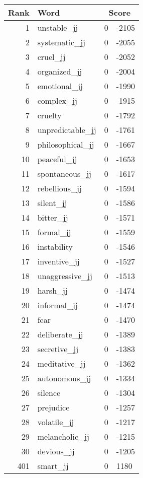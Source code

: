\begin{longtable}[!htbp]{| rlr@{.}l |}
    \hline
    \textbf{Rank} & \textbf{Word} & \multicolumn{2}{c|}{\textbf{Score}} \\
    \hline
    \endhead
    1 & unstable\_jj & 0 & -2105 \\
    2 & systematic\_jj & 0 & -2055 \\
    3 & cruel\_jj & 0 & -2052 \\
    4 & organized\_jj & 0 & -2004 \\
    5 & emotional\_jj & 0 & -1990 \\
    6 & complex\_jj & 0 & -1915 \\
    7 & cruelty & 0 & -1792 \\
    8 & unpredictable\_jj & 0 & -1761 \\
    9 & philosophical\_jj & 0 & -1667 \\
    10 & peaceful\_jj & 0 & -1653 \\
    11 & spontaneous\_jj & 0 & -1617 \\
    12 & rebellious\_jj & 0 & -1594 \\
    13 & silent\_jj & 0 & -1586 \\
    14 & bitter\_jj & 0 & -1571 \\
    15 & formal\_jj & 0 & -1559 \\
    16 & instability & 0 & -1546 \\
    17 & inventive\_jj & 0 & -1527 \\
    18 & unaggressive\_jj & 0 & -1513 \\
    19 & harsh\_jj & 0 & -1474 \\
    20 & informal\_jj & 0 & -1474 \\
    21 & fear & 0 & -1470 \\
    22 & deliberate\_jj & 0 & -1389 \\
    23 & secretive\_jj & 0 & -1383 \\
    24 & meditative\_jj & 0 & -1362 \\
    25 & autonomous\_jj & 0 & -1334 \\
    26 & silence & 0 & -1304 \\
    27 & prejudice & 0 & -1257 \\
    28 & volatile\_jj & 0 & -1217 \\
    29 & melancholic\_jj & 0 & -1215 \\
    30 & devious\_jj & 0 & -1205 \\
    401 & smart\_jj & 0 & 1180 \\

\end{longtable}
